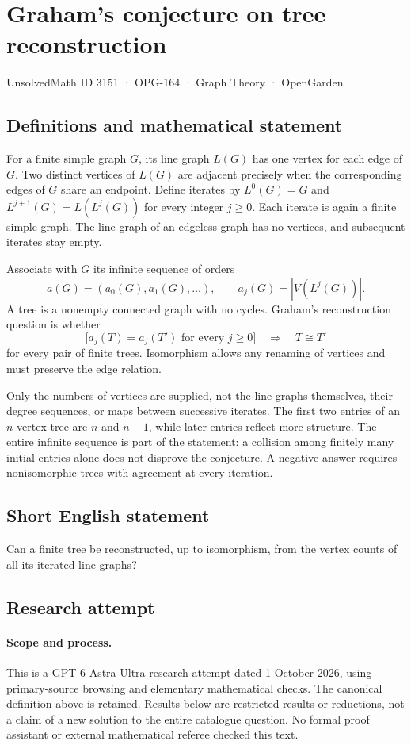 \documentclass[11pt,a4paper]{article}
\begin{document}
\section*{Graham's conjecture on tree reconstruction}\label{3151}
{\small UnsolvedMath ID 3151 · OPG-164 · Graph Theory · OpenGarden}
\subsection{Definitions and mathematical statement}
For a finite simple graph $G$, its line graph $L(G)$ has one vertex
for each edge of $G$. Two distinct vertices of $L(G)$ are adjacent
precisely when the corresponding edges of $G$ share an endpoint.
Define iterates by $L^0(G)=G$ and $L^{j+1}(G)=L(L^j(G))$ for every
integer $j\geq0$. Each iterate is again a finite simple graph.
The line graph of an edgeless graph has no vertices, and subsequent
iterates stay empty.

Associate with $G$ its infinite sequence of orders
\[
 a(G)=(a_0(G),a_1(G),\ldots),\qquad a_j(G)=|V(L^j(G))|.
\]
A tree is a nonempty connected graph with no cycles. Graham's
reconstruction question is whether
\[
 \bigl[a_j(T)=a_j(T')\text{ for every }j\geq0\bigr]
 \quad\Longrightarrow\quad T\cong T'
\]
for every pair of finite trees. Isomorphism allows any renaming
of vertices and must preserve the edge relation.

Only the numbers of vertices are supplied, not the line graphs
themselves, their degree sequences, or maps between successive
iterates. The first two entries of an $n$-vertex tree are $n$ and
$n-1$, while later entries reflect more structure. The entire
infinite sequence is part of the statement: a collision among
finitely many initial entries alone does not disprove the
conjecture. A negative answer requires nonisomorphic trees with
agreement at every iteration.
\subsection{Short English statement}
Can a finite tree be reconstructed, up to isomorphism, from the vertex counts of all its iterated line graphs?
\subsection{Research attempt}
\paragraph{Scope and process.}
This is a GPT-6 Astra Ultra research attempt dated 1 October 2026, using
primary-source browsing and elementary mathematical checks. The canonical
definition above is retained. Results below are restricted results or
reductions, not a claim of a new solution to the entire catalogue question.
No formal proof assistant or external mathematical referee checked this text.
\end{document}
